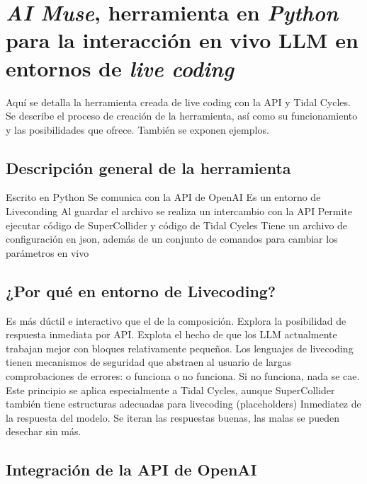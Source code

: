\chapter{\emph{AI Muse}, herramienta en \emph{Python} para la interacción en vivo LLM en entornos de \emph{live coding}}
\label{chap:ai_muse}


Aquí se detalla la herramienta creada de live coding con la API y Tidal Cycles. Se describe el proceso de creación de la herramienta, así como su funcionamiento y las posibilidades que ofrece. También se exponen ejemplos.

\section{Descripción general de la herramienta}

Escrito en Python
Se comunica con la API de OpenAI
Es un entorno de Liveconding
Al guardar el archivo se realiza un intercambio con la API
Permite ejecutar código de SuperCollider y código de Tidal Cycles
Tiene un archivo de configuración en json, además de un conjunto de comandos para cambiar los parámetros en vivo

\section{¿Por qué en entorno de Livecoding?}

Es más dúctil e interactivo que el de la composición.
Explora la posibilidad de respuesta inmediata por API.
Explota el hecho de que los LLM actualmente trabajan mejor con bloques relativamente pequeños.
Los lenguajes de livecoding tienen mecanismos de seguridad que abstraen al usuario de largas comprobaciones de errores: o funciona o no funciona. Si no funciona, nada se cae. Este principio se aplica especialmente a Tidal Cycles, aunque SuperCollider también tiene estructuras adecuadas para livecoding (placeholders)
Inmediatez de la respuesta del modelo. Se iteran las respuestas buenas, las malas se pueden desechar sin más.

\section{Integración de la API de OpenAI}

